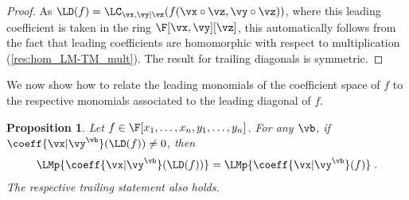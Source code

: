 \documentclass[11pt]{article}
\numberwithin{equation}{section}
\newtheorem{proposition}[theorem]{Proposition}
\theoremstyle{definition}
\theoremstyle{plain}
\begin{document}
\begin{proof}
        As $\LD(f)=\LC_{\vx,\vy|\vz}(f(\vx\circ\vz,\vy\circ\vz))$, where this leading coefficient is taken in the ring $\F[\vx,\vy][\vz]$, this automatically follows from the fact that leading coefficients are homomorphic with respect to multiplication (\autoref{res:hom_LM-TM_mult}).  The result for trailing diagonals is symmetric.
\end{proof}

We now show how to relate the leading monomials of the coefficient space of $f$ to the respective monomials associated to the leading diagonal of $f$.

\begin{proposition}\label{res:diagonal:tm}
        Let $f\in\F[x_1,\ldots,x_n,y_1,\ldots,y_n]$.  For any $\vb$, if $\coeff{\vx|\vy^\vb}(\LD(f))\ne 0$, then
        \[
                \LMp{\coeff{\vx|\vy^\vb}(\LD(f))}=\LMp{\coeff{\vx|\vy^\vb}(f)}
                \;.
        \]
        The respective trailing statement also holds.
\end{proposition}
\end{document}
